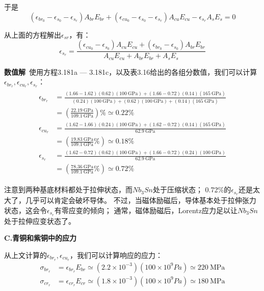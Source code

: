 于是
\begin{equation*}
(\epsilon_{br_0}-\epsilon_{s_0}-\epsilon_{s_r})A_{br}E_{br}+(\epsilon_{cu_0}-\epsilon_{s_0}-\epsilon_{s_r})A_{cu}E_{cu}-\epsilon_{s_r}A_sE_s=0
\end{equation*}

从上面的方程解出$\epsilon_{sr}$，有：
\begin{equation}%
\epsilon_{s_r}=\frac{(\epsilon_{cu_0}-\epsilon_{s_0})A_{cu}E_{cu}+(\epsilon_{br_0}-\epsilon_{s_0})A_{br}E_{br}}{A_{cu}E_{cu}+A_{br}E_{br}+A_{s}E_{s}}
\end{equation}

\textbf{数值解}\ 使用方程3.181a — 3.181c，以及表3.16给出的各组分数值，我们可以计算
$\epsilon_{br_r},\epsilon_{cu_r}, \epsilon_{s_r}$：
\begin{eqnarray*}%
\begin{split}
\epsilon_{br_r}&=\frac{(1.66-1.62)(0.62)(100\ \mathrm{GPa})+(1.66-0.72)(0.14)(165\ \mathrm{GPa})}{(0.24)(100\ \mathrm{GPa})+(0.62)(100\ \mathrm{GPa})+(0.14)(165\ \mathrm{GPa})}\\
&=(\frac{22.19\ \mathrm{GPa}}{109.1\ \mathrm{GPa}})\% \simeq0.22\% \\
\epsilon_{cu_r}&=\frac{(1.62-1.66)(0.24)(100\ \mathrm{GPa})+(1.62-0.72)(0.14)(165\ \mathrm{GPa})}{62.9\ \mathrm{GPa}}\\
&=(\frac{19.83\ \mathrm{GPa}}{109.1\ \mathrm{GPa}}\%)\simeq0.18\% \\
\epsilon_{s_r}&=\frac{(1.62-0.72)(0.62)(100\ \mathrm{GPa})+(1.66-0.72)(0.24)(100\ \mathrm{GPa})}{62.9\ \mathrm{GPa}}\\
&=(\frac{78.36\ \mathrm{GPa}}{109.1\ \mathrm{GPa}}\%)\simeq0.72\% 
\end{split}
\end{eqnarray*}

注意到两种基底材料都处于拉伸状态，而$Nb_3Sn$处于压缩状态；
0.72\%的$\epsilon_{s_r}$还是太大了，几乎可以肯定会破坏导体。
不过，当磁体励磁后，导体基本处于拉伸张力状态，这会令$\epsilon_{s_r}$有零应变的倾向；
通常，磁体励磁后，Lorentz应力足以让$Nb_3Sn$处于拉伸应变状态了。

\textbf{C.青铜和紫铜中的应力}

从上文计算的$\epsilon_{br_r},\epsilon_{cu_r}$，我们可以计算响应的应力：
 \begin{eqnarray*}
\sigma_{br_r}&=\epsilon_{br_r}E_{br}\simeq(2.2\times10^{-3})(100\times10^9Pa)\simeq220\ \mathrm{MPa}\\
\sigma_{cr_r}&=\epsilon_{cr_r}E_{cr}\simeq(1.8\times10^{-3})(100\times10^9Pa)\simeq180\ \mathrm{MPa}
\end{eqnarray*}

